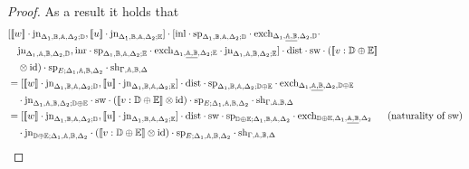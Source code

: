 \documentclass[10pt,a4paper]{amsart}
\theoremstyle{definition}
\theoremstyle{definition}
\theoremstyle{definition}
\theoremstyle{definition}
\theoremstyle{definition}
\theoremstyle{definition}
\begin{document}
\begin{proof}
As a result it holds that 
\begin{align*}
  & [[\![ w ]\!] \cdot \text{jn}_{\Delta_{1} ,\typeB,\typeA,  \Delta_{2};\typeD},  [\![u ]\!] \cdot \text{jn}_{\Delta_{1} ,\typeB,\typeA,  \Delta_{2};\typeE}] \cdot [\inl \cdot  \text{sp}_{\Delta_{1}, \typeB, \typeA, \Delta_{2};\typeD} \cdot  \text{exch}_{\Delta_{1},\underline{\typeA,\typeB},  \Delta_{2},\typeD} \cdot   \\
  & \hspace{10pt}  \text{jn}_{\Delta_{1},\typeA,\typeB,  \Delta_{2},\typeD}, \inr \cdot  \text{sp}_{\Delta_{1}, \typeB, \typeA, \Delta_{2};\typeE} \cdot  \text{exch}_{\Delta_{1},\underline{\typeA,\typeB},  \Delta_{2};\typeE} \cdot  \text{jn}_{\Delta_{1},\typeA,\typeB,  \Delta_{2};\typeE} ] \cdot \text{dist} \cdot \text{sw} \cdot ([\![  v : \typeD \oplus \typeE  ]\!] \\
  & \hspace{10pt} \otimes \text{id})  \cdot\text{sp}_{E; \Delta_{1},\typeA,\typeB,  \Delta_{2}} \cdot \text{sh}_{\Gamma,\typeA, \typeB,\Delta} \\ 
  & = [[\![ w ]\!] \cdot \text{jn}_{\Delta_{1} ,\typeB,\typeA,  \Delta_{2};\typeD},  [\![u ]\!] \cdot \text{jn}_{\Delta_{1} ,\typeB,\typeA,  \Delta_{2};\typeE}] \cdot \text{dist} \cdot \text{sp}_{\Delta_{1}, \typeB, \typeA, \Delta_{2}; \typeD \oplus\typeE} \cdot  \text{exch}_{\Delta_{1},\underline{\typeA,\typeB},  \Delta_{2}, \typeD \oplus\typeE}\\
  & \hspace{10pt}  \cdot  \text{jn}_{\Delta_{1},\typeA,\typeB,  \Delta_{2}; \typeD \oplus\typeE}  \cdot \text{sw} \cdot ([\![  v : \typeD \oplus \typeE  ]\!] \otimes \text{id})  \cdot\text{sp}_{E; \Delta_{1},\typeA,\typeB,  \Delta_{2}} \cdot \text{sh}_{\Gamma,\typeA, \typeB,\Delta}\\
  & = [[\![ w ]\!] \cdot \text{jn}_{\Delta_{1} ,\typeB,\typeA,  \Delta_{2};\typeD},  [\![u ]\!] \cdot \text{jn}_{\Delta_{1} ,\typeB,\typeA,  \Delta_{2};\typeE}] \cdot \text{dist} \cdot \text{sw} \cdot \text{sp}_{\typeD \oplus\typeE;\Delta_{1}, \typeB, \typeA, \Delta_{2}} \cdot  \text{exch}_{\typeD \oplus\typeE, \Delta_{1},\underline{\typeA,\typeB},  \Delta_{2}} & {\text{(naturality of sw)}} \\
  & \hspace{10pt} \cdot  \text{jn}_{\typeD \oplus\typeE;\Delta_{1},\typeA,\typeB,  \Delta_{2}} \cdot ([\![  v : \typeD \oplus \typeE  ]\!] \otimes \text{id})  \cdot\text{sp}_{E; \Delta_{1},\typeA,\typeB,  \Delta_{2}} \cdot \text{sh}_{\Gamma,\typeA, \typeB,\Delta} \\

\end{align*}
\end{proof}
\end{document}
